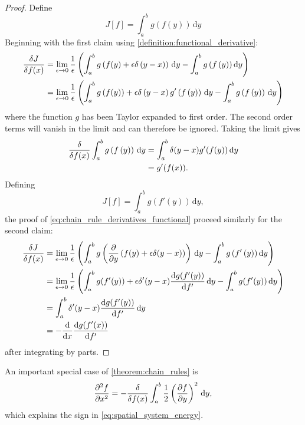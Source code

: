 \begin{proof}
  Define
  \begin{equation*}
    J[f] = \int_a^b g\left(f\left(y\right)\right)\,\mathrm{d}y
  \end{equation*}
  Beginning with the first claim using \cref{definition:functional_derivative}:
  \begin{align*}
    \fdv{J}{f(x)}  &= \lim_{\epsilon\rightarrow 0} \frac{1}{\epsilon} \left(\int_a^b g\left(f(y) + \epsilon \delta\left(y-x\right)\right)\,\mathrm{d}y
                                                                     - \int_a^b g\left(f\left(y\right)\right)\mathrm{d}y \right)\\
    &=  \lim_{\epsilon\rightarrow 0} \frac{1}{\epsilon} \left(\int_a^b g\left(f(y)\right) + \epsilon \delta\left(y-x\right)g'\left(f\left(y\right)\right)\,\mathrm{d}y
                                                                     - \int_a^b g\left(f\left(y\right)\right)\,\mathrm{d}y\right)
  \end{align*}
  where the function $g$ has been Taylor expanded to first order. The second order terms will vanish in the limit and can therefore be ignored.
  Taking the limit gives
  \begin{align*}
    \fdv{f(x)} \int_a^b g\left(f\left(y\right)\right)\,\mathrm{d}y &= \int_a^b \delta(y - x) g'(f(y))\,\mathrm{d}y \\
                                                                   &= g'(f(x)).                                                              
  \end{align*}
  Defining
  \begin{equation*}
    J[f] =  \int_a^b g\left(f'\left(y\right)\right)\,\mathrm{d}y,
  \end{equation*}
  the proof of \cref{eq:chain_rule_derivatives_functional} proceed similarly for the second claim:
  \begin{align*}
    \fdv{J}{f(x)}  &= \lim_{\epsilon\rightarrow 0} \frac{1}{\epsilon}\left(\int_a^b g\left(\pdv{y}\left(f(y) + \epsilon \delta (y-x)\right)\right)\, \mathrm{d}y- \int_a^b g \left( f' \left( y \right) \right)\mathrm{d}y\right)       \\
                                                                    &= \lim_{\epsilon\rightarrow 0} \frac{1}{\epsilon}\left(\int_a^b g(f'(y)) + \epsilon \delta' (y-x)\dv{g(f'(y))}{f'}\, \mathrm{d}y- \int_a^b g(f'(y))\,\mathrm{d}y\right) \\
                                                                    &= \int_a^b \delta' (y-x)\dv{g(f'(y))}{f'}\, \mathrm{d}y \\
    &= - \dv{x} \dv{g(f'(x))}{f'}
  \end{align*}
  after integrating by parts.
\end{proof}

An important special case of \cref{theorem:chain_rules} is
\begin{equation}
  \label{eq:derivative_of_squared_derivative}
  \pdv[2]{f}{x} = -\fdv{f(x)}\int_a^b \frac{1}{2}\left(\pdv{f}{y}\right)^2\,\mathrm{d}y,
\end{equation}
which explains the sign in \cref{eq:spatial_system_energy}.